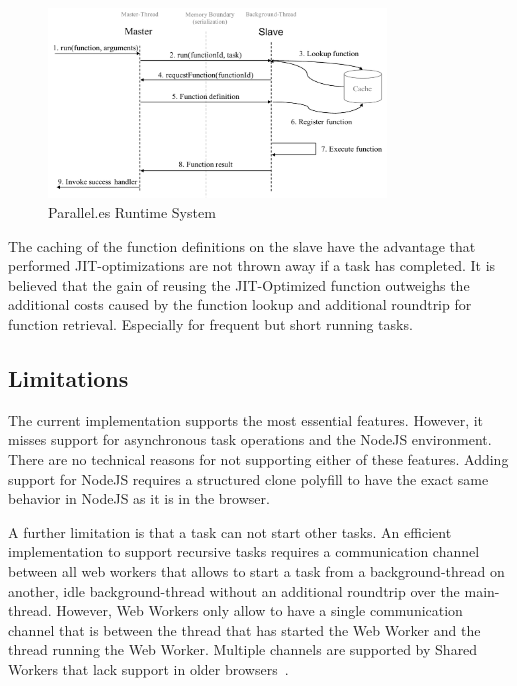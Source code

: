 \begin{figure}
	\centering
	\includegraphics[width=0.8\textwidth]{runtime-system.pdf}

	\caption{Parallel.es Runtime System}
	\label{fig:runtime-system}
\end{figure}

The caching of the function definitions on the slave have the advantage that performed JIT-optimizations are not thrown away if a task has completed. It is believed that the gain of reusing the JIT-Optimized function outweighs the additional costs caused by the function lookup and additional roundtrip for function retrieval. Especially for frequent but short running tasks. 


\subsection{Limitations}
The current implementation supports the most essential features. However, it misses support for asynchronous task operations and the NodeJS environment. There are no technical reasons for not supporting either of these features. Adding support for NodeJS requires a structured clone polyfill to have the exact same behavior in NodeJS as it is in the browser.

A further limitation is that a task can not start other tasks. An efficient implementation to support recursive tasks requires a communication channel between all web workers that allows to start a task from a background-thread on another, idle background-thread without an additional roundtrip over the main-thread. However, Web Workers only allow to have a single communication channel that is between the thread that has started the Web Worker and the thread running the Web Worker. Multiple channels are supported by Shared Workers that lack support in older browsers~\cite[section 4.6.4]{w3cWebWorker}.